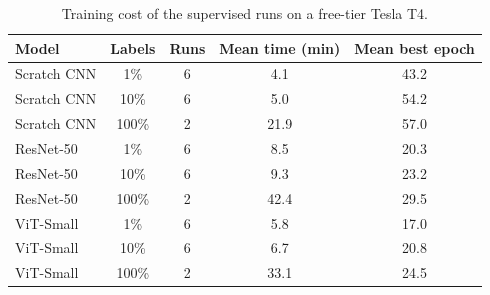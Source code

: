\begin{table}[t]
\centering
\caption{Training cost of the supervised runs on a free-tier Tesla T4.}
\label{tab:training_cost}
\small
\begin{tabular}{lcccc}
\toprule
Model & Labels & Runs & Mean time (min) & Mean best epoch \\
\midrule
Scratch CNN & 1\% & 6 & 4.1 & 43.2 \\
Scratch CNN & 10\% & 6 & 5.0 & 54.2 \\
Scratch CNN & 100\% & 2 & 21.9 & 57.0 \\
ResNet-50 & 1\% & 6 & 8.5 & 20.3 \\
ResNet-50 & 10\% & 6 & 9.3 & 23.2 \\
ResNet-50 & 100\% & 2 & 42.4 & 29.5 \\
ViT-Small & 1\% & 6 & 5.8 & 17.0 \\
ViT-Small & 10\% & 6 & 6.7 & 20.8 \\
ViT-Small & 100\% & 2 & 33.1 & 24.5 \\
\bottomrule
\end{tabular}
\end{table}
